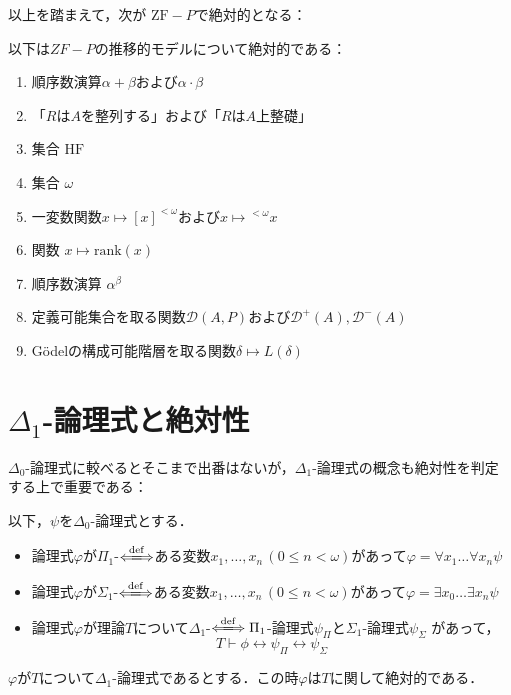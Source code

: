 \documentclass[xelatex,a4j,jadriver=standard]{bxjsarticle}
\renewcommand{\emph}[1]{\textsf{\textgt{#1}}}
\newcommand{\ZF}{\mathrm{ZF}}
\newcommand{\rank}{\mathrm{rank}}
\newcommand{\HF}{\mathrm{HF}}
\begin{document}
以上を踏まえて，次が $\ZF-P$で絶対的となる：

\begin{theorem}[$ZF-P$で絶対的]
 以下は$ZF-P$の推移的モデルについて絶対的である：
 \begin{enumerate}
  \item 順序数演算$\alpha + \beta$および$\alpha \cdot \beta$
  \item 「$R$は$A$を整列する」および「$R$は$A$上整礎」
  \item 集合 $\HF$
  \item 集合 $\omega$
  \item 一変数関数$x \mapsto [x]^{<\omega}$および$x \mapsto {}^{<\omega} x$
  \item 関数 $x \mapsto \rank(x)$
  \item 順序数演算 $\alpha^\beta$
  \item 定義可能集合を取る関数$\mathcal{D}(A, P)$および$\mathcal{D}^+(A), \mathcal{D}^-(A)$
  \item G\"{o}delの構成可能階層を取る関数$\delta \mapsto L(\delta)$
 \end{enumerate}
\end{theorem}

\section{$\Delta_1$-論理式と絶対性}
$\Delta_0$-論理式に較べるとそこまで出番はないが，$\Delta_1$-論理式の概念も絶対性を判定する上で重要である：

\begin{definition}
 以下，$\psi$を$\Delta_0$-論理式とする．
 
 \begin{itemize}
  \item 論理式$\varphi$が$\Pi_1$-\emph{論理式}$\defs$ある変数$x_1, \dots, x_n\,(0 \leq n < \omega)$があって$\varphi = \forall x_1 \dots \forall x_n \psi$
  \item 論理式$\varphi$が$\Sigma_1$-\emph{論理式}$\defs$ある変数$x_1, \dots, x_n\,(0 \leq n < \omega)$があって$\varphi = \exists x_0 \dots \exists x_n \psi$
  \item 論理式$\varphi$が理論$T$について$\Delta_1$-\emph{論理式}$\defs \Pi_1$-論理式$\psi_\Pi$と$\Sigma_1$-論理式$\psi_\Sigma$ があって，
	\[
	 T \vdash \phi \leftrightarrow \psi_\Pi \leftrightarrow \psi_\Sigma
	\]
 \end{itemize}
\end{definition}

\begin{theorem}
 $\varphi$が$T$について$\Delta_1$-論理式であるとする．この時$\varphi$は$T$に関して絶対的である．
\end{theorem}

\nocite{Kunen:2011,Jech:2002,Arai:2011,Kunen:2009}
\printbibliography[title=参考文献]
\end{document}
